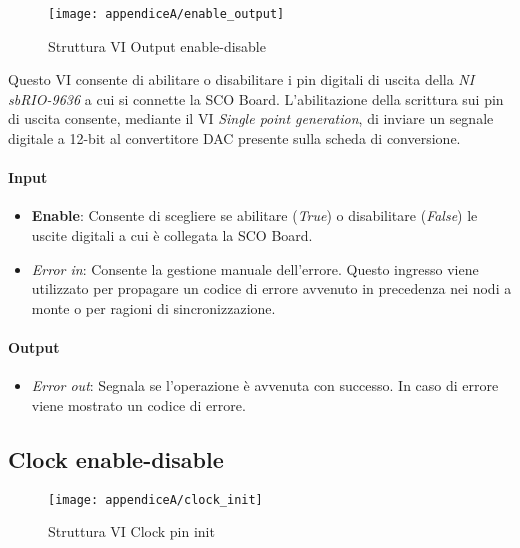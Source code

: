\begin{figure}[H]
	\begin{center}
		\texttt{[image: appendiceA/enable\_output]}
		\caption{Struttura VI Output enable-disable}
	\end{center}
\end{figure}

Questo VI consente di abilitare o disabilitare i pin digitali di uscita della \textit{NI sbRIO-9636} a cui si connette la SCO Board. L'abilitazione della scrittura sui pin di uscita consente, mediante il VI \textit{Single point generation}, di inviare un segnale digitale a 12-bit al convertitore DAC presente sulla scheda di conversione.

\paragraph*{Input}
\begin{itemize}
	\item \textbf{Enable}: Consente di scegliere se abilitare (\textit{True}) o disabilitare (\textit{False}) le uscite digitali a cui è collegata la SCO Board.
	\item \textit{Error in}: Consente la gestione manuale dell'errore. Questo ingresso viene utilizzato per propagare un codice di errore avvenuto in precedenza nei nodi a monte o per ragioni di sincronizzazione.
\end{itemize}

\paragraph*{Output}
\begin{itemize}
	\item \textit{Error out}: Segnala se l'operazione è avvenuta con successo. In caso di errore viene mostrato un codice di errore.
\end{itemize}

\subsection*{Clock enable-disable}

\begin{figure}[H]
	\begin{center}
		\texttt{[image: appendiceA/clock\_init]}
		\caption{Struttura VI Clock pin init}
	\end{center}
\end{figure}

